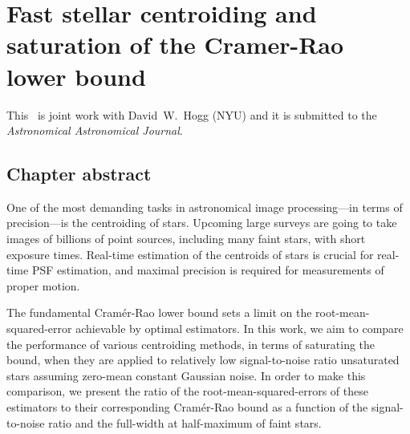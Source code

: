 




\chapter{Fast stellar centroiding and saturation of the Cramer-Rao lower bound}

This \paper\ is joint work with David~W.~Hogg (NYU) and it is submitted to the \emph{Astronomical
Astronomical Journal}. 

\section{Chapter abstract}

One of the most demanding tasks in astronomical image processing---in terms of precision---is 
the centroiding of stars. Upcoming large surveys are going to take images of 
billions of point sources, including many faint stars, with short exposure times. 
Real-time estimation of the centroids of stars is crucial for real-time PSF estimation, 
and maximal precision is required for measurements of proper motion. 

The fundamental Cram\'{e}r-Rao lower bound sets a limit on the root-mean-squared-error 
achievable by optimal estimators. In this work, we aim to compare 
the performance of various centroiding methods, in terms of saturating the bound, when they 
are applied to relatively low signal-to-noise ratio unsaturated stars assuming zero-mean 
constant Gaussian noise. In order to make this comparison, we present the ratio of the root-mean-squared-errors of 
these estimators to their corresponding Cram\'{e}r-Rao bound as a function of the signal-to-noise ratio 
and the full-width at half-maximum of faint stars. 

